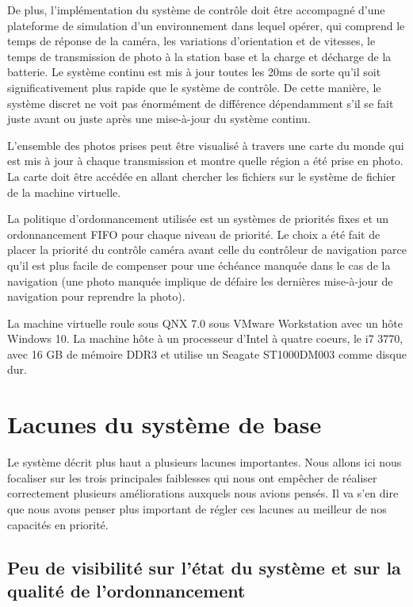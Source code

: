 \documentclass[journal]{IEEEtran}
\begin{document}
De plus, l'implémentation du système de contrôle doit être accompagné d'une plateforme de simulation d'un environnement dans lequel opérer, qui comprend le temps de réponse de la caméra, les variations d'orientation et de vitesses, le temps de transmission de photo à la station base et la charge et décharge de la batterie. Le système continu est mis à jour toutes les 20ms de sorte qu'il soit significativement plus rapide que le système de contrôle. De cette manière, le système discret ne voit pas énormément de différence dépendamment s'il se fait juste avant ou juste après une mise-à-jour du système continu.

L'ensemble des photos prises peut être visualisé à travers une carte du monde qui est mis à jour à chaque transmission et montre quelle région a été prise en photo. La carte doit être accédée en allant chercher les fichiers sur le système de fichier de la machine virtuelle.

La politique d'ordonnancement utilisée est un systèmes de priorités fixes et un ordonnancement FIFO pour chaque niveau de priorité. Le choix a été fait de placer la priorité du contrôle caméra avant celle du contrôleur de navigation parce qu'il est plus facile de compenser pour une échéance manquée dans le cas de la navigation (une photo manquée implique de défaire les dernières mise-à-jour de navigation pour reprendre la photo).

La machine virtuelle roule sous QNX 7.0 sous VMware Workstation avec un hôte Windows 10. La machine hôte à un processeur d'Intel à quatre coeurs, le i7 3770, avec 16 GB de mémoire DDR3 et utilise un Seagate ST1000DM003 comme disque dur. 


\section{Lacunes du système de base}
\label{lacunes}

Le système décrit plus haut a plusieurs lacunes importantes. Nous allons ici nous focaliser sur les trois principales faiblesses qui nous ont empêcher de réaliser correctement plusieurs améliorations auxquels nous avions pensés. Il va s'en dire que nous avons penser plus important de régler ces lacunes au meilleur de nos capacités en priorité.

\subsection{Peu de visibilité sur l'état du système et sur la qualité de l'ordonnancement}
\end{document}
